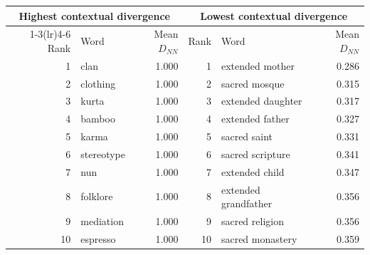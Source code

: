 \begin{tabular}{@{}r l r r l r@{}}
\toprule
\multicolumn{3}{c}{Highest contextual divergence} & \multicolumn{3}{c}{Lowest contextual divergence} \\
\cmidrule(lr){1-3}\cmidrule(lr){4-6}
Rank & Word & Mean $D_{NN}$ & Rank & Word & Mean $D_{NN}$ \\
\midrule
1 & clan & 1.000 & 1 & extended mother & 0.286 \\
2 & clothing & 1.000 & 2 & sacred mosque & 0.315 \\
3 & kurta & 1.000 & 3 & extended daughter & 0.317 \\
4 & bamboo & 1.000 & 4 & extended father & 0.327 \\
5 & karma & 1.000 & 5 & sacred saint & 0.331 \\
6 & stereotype & 1.000 & 6 & sacred scripture & 0.341 \\
7 & nun & 1.000 & 7 & extended child & 0.347 \\
8 & folklore & 1.000 & 8 & extended grandfather & 0.356 \\
9 & mediation & 1.000 & 9 & sacred religion & 0.356 \\
10 & espresso & 1.000 & 10 & sacred monastery & 0.359 \\
\bottomrule
\end{tabular}
